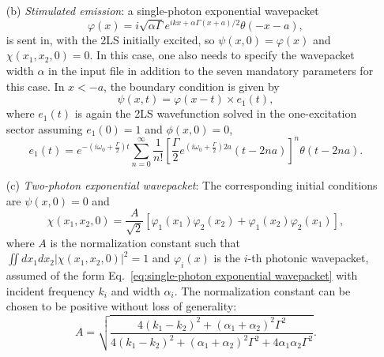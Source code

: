 \documentclass[12pt,letter,onecolumn,notitlepage]{article}
\begin{document}
\begin{enumerate}
    \item[(b)] \textit{Stimulated emission}: a single-photon exponential wavepacket
\begin{equation}
	\varphi(x)=i\sqrt{\alpha \Gamma} e^{ikx+\alpha\Gamma(x+a)/2}\theta(-x-a),
	\label{eq:single-photon exponential wavepacket}
\end{equation}
 is sent in, with the 2LS initially excited, so $\psi(x,0)=\varphi(x)$ and $\chi(x_1, x_2, 0)=0$. In this case, one also needs to specify the wavepacket width $\alpha$ in the input file in addition to the seven mandatory parameters for this case. In $x<-a$, the boundary condition is given by 
\begin{equation}
\psi(x,t) = \varphi(x-t)\times e_1(t),
\end{equation}
where $e_1(t)$ is again the 2LS wavefunction solved in the one-excitation sector assuming $e_1(0)=1$ and $\phi(x, 0) =0$,
\begin{equation}
e_1(t)=e^{-(i\omega_0+\frac{\Gamma}{2})t}\sum_{n=0}^{\infty}\frac{1}{n!}\left[\frac{\Gamma}{2}e^{(i\omega_0+\frac{\Gamma}{2})2a}(t-2na)\right]^n\theta(t-2na).
\label{eq:spontaneous emission solution}
\end{equation}

	\item[(c)] \emph{Two-photon exponential wavepacket}: 
	The corresponding initial conditions are $\psi(x,0)=0$ and
\begin{equation}
\chi(x_1, x_2, 0) = \frac{A}{\sqrt{2}}\left[\varphi_1(x_1)\varphi_2(x_2)+\varphi_1(x_2)\varphi_2(x_1)\right],
\end{equation} 
where $A$ is the normalization constant such that $\iint dx_1 dx_2 |\chi(x_1, x_2, 0)|^2=1$ and $\varphi_i(x)$ is the $i$-th photonic wavepacket, assumed of the form Eq.~\eqref{eq:single-photon exponential wavepacket} with incident frequency $k_i$ and width $\alpha_i$.
The normalization constant can be chosen to be positive without loss of generality:
\begin{equation}
A = \sqrt{\frac{4(k_1- k_2)^2+(\alpha_1+\alpha_2)^2\Gamma ^2}{4(k_1- k_2)^2 +(\alpha_1+\alpha_2)^2\Gamma ^2+4\alpha_1\alpha_2\Gamma ^2}}.
\end{equation}


\end{enumerate}
\end{document}
